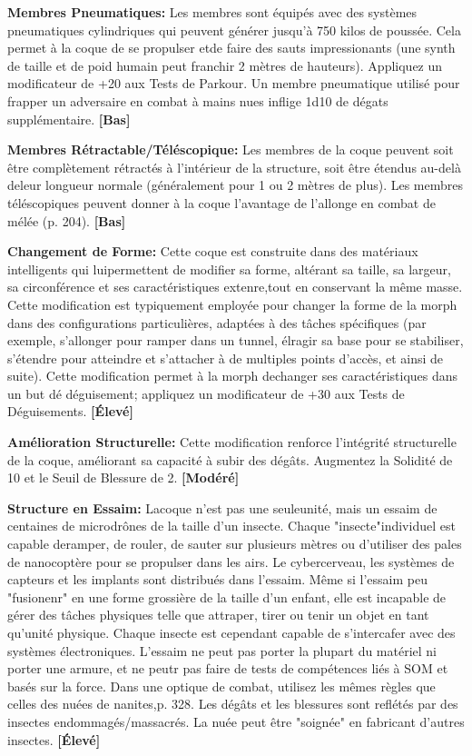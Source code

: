 {{\textbf{Membres Pneumatiques:} Les membres sont équipés avec des systèmes pneumatiques cylindriques qui peuvent générer jusqu'à 750 kilos de poussée. Cela permet à la coque de se propulser etde faire des sauts impressionants (une synth de taille et de poid humain peut franchir 2 mètres de hauteurs). Appliquez un modificateur de +20 aux Tests de Parkour. Un membre pneumatique utilisé pour frapper un adversaire en combat à mains nues inflige 1d10 de dégats supplémentaire. \textbf{[Bas]} 

\textbf{Membres Rétractable/Téléscopique:} Les membres de la coque peuvent soit être complètement rétractés à l'intérieur de la structure, soit être étendus au-delà deleur longueur normale (généralement pour 1 ou 2 mètres de plus). Les membres téléscopiques peuvent donner à la coque l'avantage de l'allonge en combat de mélée (p. 204). \textbf{[Bas]} 

\textbf{Changement de Forme:} Cette coque est construite dans des matériaux intelligents qui luipermettent de modifier sa forme, altérant sa taille, sa largeur, sa circonférence et ses caractéristiques extenre,tout en conservant la même masse. Cette modification est typiquement employée pour changer la forme de la morph dans des configurations particulières, adaptées à des tâches spécifiques (par exemple, s'allonger pour ramper dans un tunnel, élragir sa base pour se stabiliser, s'étendre pour atteindre et s'attacher à de multiples points d'accès, et ainsi de suite). Cette modification permet à la morph dechanger ses caractéristiques dans un but dé déguisement; appliquez un modificateur de +30 aux Tests de Déguisements. \textbf{[Élevé]} 

\textbf{Amélioration Structurelle:} Cette modification renforce l'intégrité structurelle de la coque, améliorant sa capacité à subir des dégâts. Augmentez la Solidité de 10 et le Seuil de Blessure de 2. \textbf{[Modéré]} 

\textbf{Structure en Essaim:} Lacoque n'est pas une seuleunité, mais un essaim de centaines de microdrônes de la taille d'un insecte. Chaque "insecte"individuel est capable deramper, de rouler, de sauter sur plusieurs mètres ou d'utiliser des pales de nanocoptère pour se propulser dans les airs. Le cybercerveau, les systèmes de capteurs et les implants sont distribués dans l'essaim. Même si l'essaim peu "fusionenr" en une forme grossière de la taille d'un enfant, elle est incapable de gérer des tâches physiques telle que attraper, tirer ou tenir un objet en tant qu'unité physique. Chaque insecte est cependant capable de s'intercafer avec des systèmes électroniques. L'essaim ne peut pas porter la plupart du matériel ni porter une armure, et ne peutr pas faire de tests de compétences liés à SOM et basés sur la force. Dans une optique de combat, utilisez les mêmes règles que celles des nuées de nanites,p. 328. Les dégâts et les blessures sont reflétés par des insectes endommagés/massacrés. La nuée peut être "soignée" en fabricant d'autres insectes. \textbf{[Élevé]} 

}}
